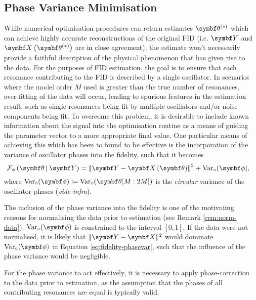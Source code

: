 \subsection{Phase Variance Minimisation}
\label{subsec:phase-variance}
While numerical optimisation procedures can return estimates $\bthstar$ which
can achieve highly accurate reconstructions of the original \acs{FID} (i.e.
$\bY$ and  $\bXthstar$ are in close agreement), the estimate won't
necessarily provide a faithful description of the physical phenomenon that has
given rise to the data. For the purposes of \ac{FID} estimation, the goal is to
ensure that each resonance contributing to the \ac{FID} is described by a
single oscillator. In scenarios where the model order $M$ used is greater than
the true number of resonances, over-fitting of the data will occur, leading to
spurious features in the estimation result, such as single resonances being fit
by multiple oscillators and/or noise components being fit. To overcome this
problem, it is desirable to include known information about the signal into the
optimisation routine as a means of guiding the parameter vector to a more
appropriate final value. One particular means of achieving this which has been
to found to be effective is the incorporation of the variance of oscillator
phases into the fidelity, such that it becomes
\begin{equation}
    \FphithY = \left \lVert \bY - \bXth \right \rVert^2 + \circvar,
    \label{eq:fidelity-phasevar}
\end{equation}
where $\circvar \coloneq \Var_{\circ}(\bth[M:2M])$ is the \emph{circular} variance of
the oscillator phases (\textit{vide infra}).
\begin{remark}
    The inclusion of the phase variance into the fidelity is one of the
    motivating reasons for normalising the data prior to estimation (see Remark
    \ref{rem:norm-data}). $\circvar$ is constrained to the interval $[0, 1]$.
    If the data were not normalised, it is likely that $\lVert \bY - \bX
    \rVert^2$ would dominate $\circvar$ in Equation \ref{eq:fidelity-phasevar},
    such that the influence of the phase variance would be negligible.
\end{remark}
For the phase variance to act effectively, it is necessary to apply
phase-correction to the data prior to estimation, as the assumption that the
phases of all contributing resonances are equal is typically
valid.
